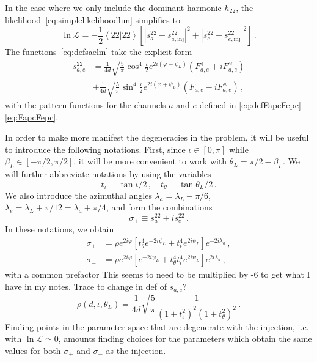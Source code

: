 \documentclass[aps,showpacs,twocolumn,prd,superscriptaddress,nofootinbib]{revtex4-1}
\newcommand{\be}{\begin{equation}}
\newcommand{\ee}{\end{equation}}
\newcommand{\bsub}{\begin{subequations}}
\newcommand{\esub}{\end{subequations}}
\newcommand\calL{{\mathcal{L}}}
\newcommand\psiL{{\psi_{L}}}
\newcommand{\jgb}[1]{{\color{DarkGreen} #1}}
\begin{document}
In the case where we only include the dominant harmonic $h_{22}$, the likelihood~\eqref{eq:simplelikelihoodhm} simplifies to
\be\label{eq:simplelikelihood22}
	\ln \calL = -\frac{1}{2} \left\langle 22 | 22 \right\rangle  \left[ \left| s_{a}^{22} - s_{a, \mathrm{inj}}^{22} \right|^{2} + \left| s_{e}^{22} - s_{e, \mathrm{inj}}^{22}\right|^{2} \right] \,.
\ee
The functions~\eqref{eq:defsaelm} take the explicit form
\begin{align}
	s_{a,e}^{22} &= \frac{1}{4d} \sqrt{\frac{5}{\pi}} \cos^{4}\frac{\iota}{2} e^{2i(\varphi-\psiL)} \left( F_{a,e}^{+} + i F_{a,e}^{\times} \right) \\
	&+ \frac{1}{4d} \sqrt{\frac{5}{\pi}} \sin^{4}\frac{\iota}{2} e^{2i(\varphi+\psiL)} \left( F_{a,e}^{+} - i F_{a,e}^{\times} \right) \,,
\end{align}
with the pattern functions for the channels $a$ and $e$ defined in \eqref{eq:defFapcFepc}-\eqref{eq:FapcFepc}.

In order to make more manifest the degeneracies in the problem, it will be useful to introduce the following notations. First, since $\iota \in [0, \pi]$ while $\beta_{L} \in [-\pi/2, \pi/2]$, it will be more convenient to work with $\theta_{L} = \pi/2 - \beta_{L}$. We will further abbreviate notations by using the variables
\be
	t_{\iota} \equiv \tan \iota/2 \,, \quad t_{\theta} \equiv \tan \theta_{L} / 2 \,.
\ee
We also introduce the azimuthal angles $\lambda_{a} = \lambda_{L} - \pi/6$, $\lambda_{e} = \lambda_{L} + \pi/12 = \lambda_{a} + \pi/4$, and form the combinations
\be
	\sigma_{\pm} \equiv s_{a}^{22} \pm i s_{e}^{22} \,.
\ee
In these notations, we obtain
\bsub\label{eq:sigmapm}
\begin{align}
	\sigma_{+} &= \rho e^{2i\varphi} \left[ t_{\theta}^{4} e^{-2 i \psiL} + t_{\iota}^{4} e^{2 i \psiL} \right] e^{-2i \lambda_{a}} \,, \\
	\sigma_{-} &= \rho e^{2i\varphi} \left[ e^{-2 i \psiL} + t_{\theta}^{4} t_{\iota}^{4} e^{2 i \psiL} \right] e^{2i \lambda_{a}} \,,
\end{align}
\esub
with a common prefactor \jgb{This seems to need to  be multiplied by -6 to get what I have in my notes. Trace to change in def of $s_{a,e}$?}
\be\label{eq:sigmafactorrho}
	\rho(d, \iota, \theta_{L}) = \frac{1}{4d} \sqrt{\frac{5}{\pi}} \frac{1}{\left( 1 + t_{\iota}^{2} \right)^{2} \left(1 + t_{\theta}^{2} \right)^{2}} \,.
\ee
Finding points in the parameter space that are degenerate with the injection, i.e. with $\ln \calL \simeq 0$, amounts finding choices for the parameters which obtain the same values for both  $\sigma_{+}$ and $\sigma_{-}$ as the injection.
\end{document}
